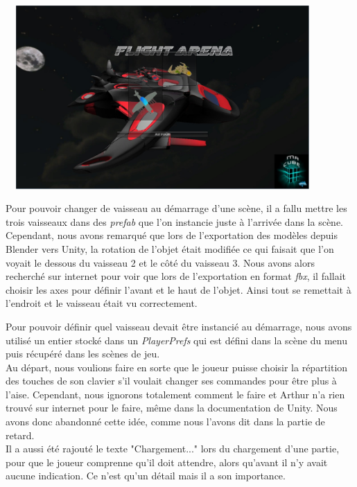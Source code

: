 \documentclass[10pt, titlepage]{report}
\begin{document}
\begin{center}
\includegraphics[height=7cm, width=12cm]{menu_selection.jpg}
\end{center}

Pour pouvoir changer de vaisseau au démarrage d'une scène, il a fallu mettre les trois vaisseaux dans des \textit{prefab} que l'on instancie juste à l'arrivée dans la scène. Cependant, nous avons remarqué que lors de l'exportation des modèles depuis Blender vers Unity, la rotation de l'objet était modifiée ce qui faisait que l'on voyait le dessous du vaisseau 2 et le côté du vaisseau 3. Nous avons alors recherché sur internet pour voir que lors de l'exportation en format \textit{fbx}, il fallait choisir les axes pour définir l'avant et le haut de l'objet. Ainsi tout se remettait à l'endroit et le vaisseau était vu correctement.

Pour pouvoir définir quel vaisseau devait être instancié au démarrage, nous avons utilisé un entier stocké dans un \textit{PlayerPrefs} qui est défini dans la scène du menu puis récupéré dans les scènes de jeu.\\

Au départ, nous voulions faire en sorte que le joueur puisse choisir la répartition des touches de son clavier s'il voulait changer ses commandes pour être plus à l'aise. Cependant, nous ignorons totalement comment le faire et Arthur n'a rien trouvé sur internet pour le faire, même dans la documentation de Unity. Nous avons donc abandonné cette idée, comme nous l'avons dit dans la partie de retard.\\

Il a aussi été rajouté le texte "Chargement..." lors du chargement d'une partie, pour que le joueur comprenne qu'il doit attendre, alors qu'avant il n'y avait aucune indication. Ce n'est qu'un détail mais il a son importance.\\
\end{document}
